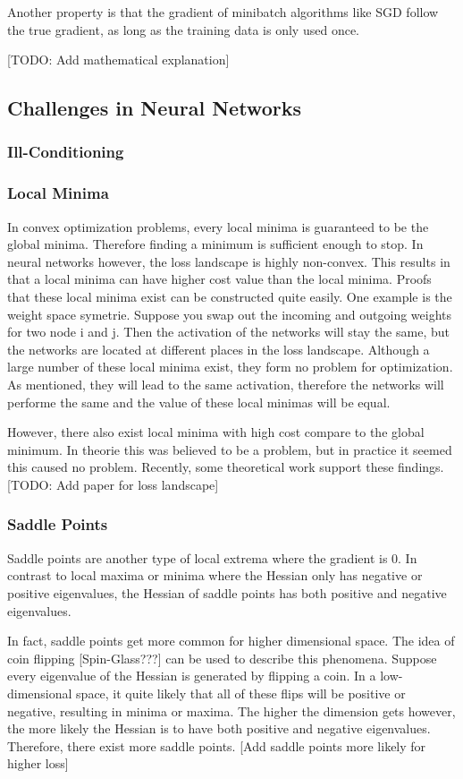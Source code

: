 Another property is that the gradient of minibatch algorithms like SGD follow
the true gradient, as long as the training data is only used once.

[TODO: Add mathematical explanation]

\subsection{Challenges in Neural Networks}
\subsubsection{Ill-Conditioning}

\subsubsection{Local Minima}
In convex optimization problems, every local minima is guaranteed to be the
global minima. Therefore finding a minimum is sufficient enough to stop. In
neural networks however, the loss landscape is highly non-convex. This results
in that a local minima can have higher cost value than the local minima. Proofs
that these local minima exist can be constructed quite easily. One example is
the weight space symetrie. Suppose you swap out the incoming and outgoing
weights for two node i and j. Then the activation of the networks will stay the
same, but the networks are located at different places in the loss landscape.
Although a large number of these local minima exist, they form no problem for
optimization. As mentioned, they will lead to the same activation, therefore the
networks will performe the same and the value of these local minimas will be
equal.

However, there also exist local minima with high cost compare to the global
minimum. In theorie this was believed to be a problem, but in practice it seemed
this caused no problem. Recently, some theoretical work support these
findings. [TODO: Add paper for loss landscape]

\subsubsection{Saddle Points}
Saddle points are another type of local extrema where the gradient is 0. In
contrast to local maxima or minima where the Hessian only has negative or
positive eigenvalues, the Hessian of saddle points has both positive and
negative eigenvalues.

In fact, saddle points get more common for higher dimensional space. The idea of
coin flipping [Spin-Glass???] can be used to describe this phenomena. Suppose
every eigenvalue of the Hessian is generated by flipping a coin. In a
low-dimensional space, it quite likely that all of these flips will be positive
or negative, resulting in minima or maxima. The higher the dimension gets
however, the more likely the Hessian is to have both positive and negative
eigenvalues. Therefore, there exist more saddle points. [Add saddle points more
likely for higher loss]


